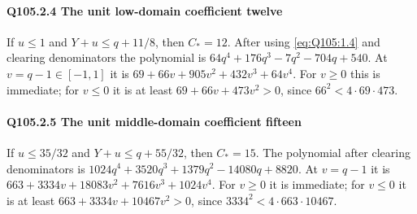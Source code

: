 \paragraph{Q105.2.4 The unit low-domain coefficient twelve}
If $u\le\allowbreak 1$ and $Y+u\le\allowbreak  q+11/8$, then $C_*=\allowbreak 12$.
After using \eqref{eq:Q105:1.4} and clearing denominators the polynomial is
$64q^4+176q^3-7q^2-704q+540$.
At $v=\allowbreak q-1\in[-1,\allowbreak 1]$ it is $69+66v+905v^2+432v^3+64v^4$.
For $v\ge\allowbreak 0$ this is immediate; for $v\le\allowbreak 0$ it is at least
$69+66v+473v^2>\allowbreak 0$, since $66^2<\allowbreak 4\cdot69\cdot473$.

\paragraph{Q105.2.5 The unit middle-domain coefficient fifteen}
If $u\le\allowbreak 35/32$ and $Y+u\le\allowbreak  q+55/32$, then $C_*=\allowbreak 15$.
The polynomial after clearing denominators is
$1024q^4+3520q^3+1379q^2-14080q+8820$.
At $v=\allowbreak q-1$ it is $663+3334v+18083v^2+7616v^3+1024v^4$.
For $v\ge\allowbreak 0$ it is immediate; for $v\le\allowbreak 0$ it is at least
$663+3334v+10467v^2>\allowbreak 0$, since $3334^2<\allowbreak 4\cdot663\cdot10467$.

